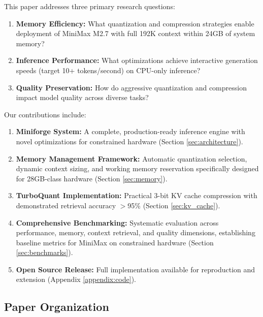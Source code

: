 This paper addresses three primary research questions:

\begin{enumerate}[label=\textbf{RQ\arabic*:}]
    \item \textbf{Memory Efficiency:} What quantization and compression strategies enable deployment of MiniMax M2.7 with full 192K context within 24GB of system memory?
    \item \textbf{Inference Performance:} What optimizations achieve interactive generation speeds (target 10+ tokens/second) on CPU-only inference?
    \item \textbf{Quality Preservation:} How do aggressive quantization and compression impact model quality across diverse tasks?
\end{enumerate}

Our contributions include:

\begin{enumerate}
    \item \textbf{Miniforge System:} A complete, production-ready inference engine with novel optimizations for constrained hardware (Section \ref{sec:architecture}).
    
    \item \textbf{Memory Management Framework:} Automatic quantization selection, dynamic context sizing, and working memory reservation specifically designed for 28GB-class hardware (Section \ref{sec:memory}).
    
    \item \textbf{TurboQuant Implementation:} Practical 3-bit KV cache compression with demonstrated retrieval accuracy $>$95\% (Section \ref{sec:kv_cache}).
    
    \item \textbf{Comprehensive Benchmarking:} Systematic evaluation across performance, memory, context retrieval, and quality dimensions, establishing baseline metrics for MiniMax on constrained hardware (Section \ref{sec:benchmarks}).
    
    \item \textbf{Open Source Release:} Full implementation available for reproduction and extension (Appendix \ref{appendix:code}).
\end{enumerate}

\subsection{Paper Organization}

